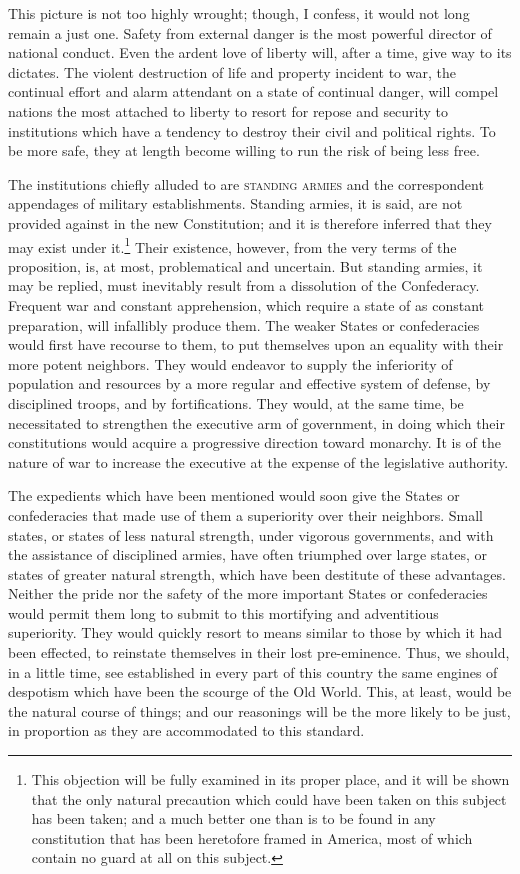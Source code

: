 This picture is not too highly wrought; though, I confess, it would not long remain a just one. Safety from external danger is the most powerful director of national conduct. Even the ardent love of liberty will, after a time, give way to its dictates. The violent destruction of life and property incident to war, the continual effort and alarm attendant on a state of continual danger, will compel nations the most attached to liberty to resort for repose and security to institutions which have a tendency to destroy their civil and political rights. To be more safe, they at length become willing to run the risk of being less free.

The institutions chiefly alluded to are \textsc{standing armies} and the correspondent appendages of military establishments. Standing armies, it is said, are not provided against in the new Constitution; and it is therefore inferred that they may exist under it.\footnote{This objection will be fully examined in its proper place, and it will be shown that the only natural precaution which could have been taken on this subject has been taken; and a much better one than is to be found in any constitution that has been heretofore framed in America, most of which contain no guard at all on this subject.} Their existence, however, from the very terms of the proposition, is, at most, problematical and uncertain. But standing armies, it may be replied, must inevitably result from a dissolution of the Confederacy. Frequent war and constant apprehension, which require a state of as constant preparation, will infallibly produce them. The weaker States or confederacies would first have recourse to them, to put themselves upon an equality with their more potent neighbors. They would endeavor to supply the inferiority of population and resources by a more regular and effective system of defense, by disciplined troops, and by fortifications. They would, at the same time, be necessitated to strengthen the executive arm of government, in doing which their constitutions would acquire a progressive direction toward monarchy. It is of the nature of war to increase the executive at the expense of the legislative authority.

The expedients which have been mentioned would soon give the States or confederacies that made use of them a superiority over their neighbors. Small states, or states of less natural strength, under vigorous governments, and with the assistance of disciplined armies, have often triumphed over large states, or states of greater natural strength, which have been destitute of these advantages. Neither the pride nor the safety of the more important States or confederacies would permit them long to submit to this mortifying and adventitious superiority. They would quickly resort to means similar to those by which it had been effected, to reinstate themselves in their lost pre-eminence. Thus, we should, in a little time, see established in every part of this country the same engines of despotism which have been the scourge of the Old World. This, at least, would be the natural course of things; and our reasonings will be the more likely to be just, in proportion as they are accommodated to this standard.


